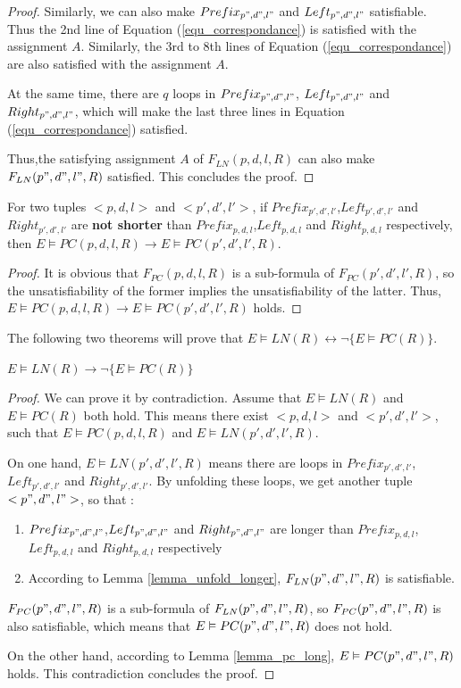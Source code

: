 \documentclass{acm_proc_article-sp}
\begin{document}
\begin{proof}
Similarly,
we can also make $Prefix_{p",d",l"}$ and $Left_{p",d",l"}$ satisfiable.
Thus the 2nd line of Equation (\ref{equ_correspondance}) is satisfied with the assignment $A$.
Similarly,
the 3rd to 8th lines of Equation (\ref{equ_correspondance}) are also satisfied with the assignment $A$.

At the same time,
there are $q$ loops in $Prefix_{p",d",l"}$, $Left_{p",d",l"}$ and $Right_{p",d",l"}$,
which will make the last three lines in Equation (\ref{equ_correspondance}) satisfied.

Thus,the satisfying assignment $A$ of $F_{LN}(p,d,l,R)$ can also make $F_{LN}(p",d",l",R)$ satisfied.
This concludes the proof.
\end{proof}

\begin{lemma}[]\label{lemma_pc_long}
For two tuples $<p,d,l>$ and $<p',d',l'>$,
if $Prefix_{p',d',l'}$,$Left_{p',d',l'}$ and $Right_{p',d',l'}$ are \textbf{not shorter} than $Prefix_{p,d,l}$,$Left_{p,d,l}$ and $Right_{p,d,l}$ respectively,
then $E\vDash PC(p,d,l,R)\to E\vDash PC(p',d',l',R)$.
\end{lemma}
\begin{proof}
It is obvious that $F_{PC}(p,d,l,R)$ is a sub-formula of $F_{PC}(p',d',l',R)$,
so the unsatisfiability of the former implies the unsatisfiability of the latter.
Thus,
$E\vDash PC(p,d,l,R)\to E\vDash PC(p',d',l',R)$ holds.
\end{proof}

The following two theorems will prove that $E\vDash LN(R)\leftrightarrow \neg \{E\vDash PC(R)\}$.

\begin{theorem}[]\label{thm_pc_nln}
$E\vDash LN(R)\to \neg \{E\vDash PC(R)\}$
\end{theorem}
\begin{proof}
We can prove it by contradiction.
Assume that $E\vDash LN(R)$ and $E\vDash PC(R)$ both hold.
This means there exist $<p,d,l>$ and $<p',d',l'>$,
such that $E\vDash PC(p,d,l,R)$ and $E\vDash LN(p',d',l',R)$.

On one hand,
$E\vDash LN(p',d',l',R)$ means there are loops in $Prefix_{p',d',l'}$,$Left_{p',d',l'}$ and $Right_{p',d',l'}$.
By unfolding these loops,
we get another tuple $<p",d",l">$,
so that :
\begin{enumerate}
\item $Prefix_{p",d",l"}$,$Left_{p",d",l"}$ and $Right_{p",d",l"}$ are longer than $Prefix_{p,d,l}$,$Left_{p,d,l}$ and $Right_{p,d,l}$ respectively
\item According to Lemma \ref{lemma_unfold_longer},
$F_{LN}(p",d",l",R)$ is satisfiable.
\end{enumerate}

$F_{PC}(p",d",l",R)$ is a sub-formula of $F_{LN}(p",d",l",R)$,
so $F_{PC}(p",d",l",R)$ is also satisfiable,
which means that $E\vDash PC(p",d",l",R)$ does not hold.

On the other hand,
according to Lemma \ref{lemma_pc_long},
$E\vDash PC(p",d",l",R)$ holds.
This contradiction concludes the proof.
\end{proof}
\end{document}
